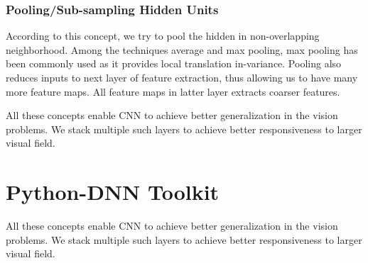 \subsubsection{Pooling/Sub-sampling Hidden Units}
According to this concept, we try to pool the hidden in non-overlapping neighborhood. Among the techniques average and max pooling, max pooling has been commonly used as it provides local translation in-variance. Pooling also reduces inputs to next layer of feature extraction, thus allowing us to have many more feature maps. All feature maps in latter layer extracts coarser features.\par
All these concepts enable CNN to achieve better generalization in the vision problems. We stack multiple such layers to achieve better responsiveness to larger visual field. \section{Python-DNN Toolkit}
All these concepts enable CNN to achieve better generalization in the vision problems. We stack multiple such layers to achieve better responsiveness to larger visual field.
